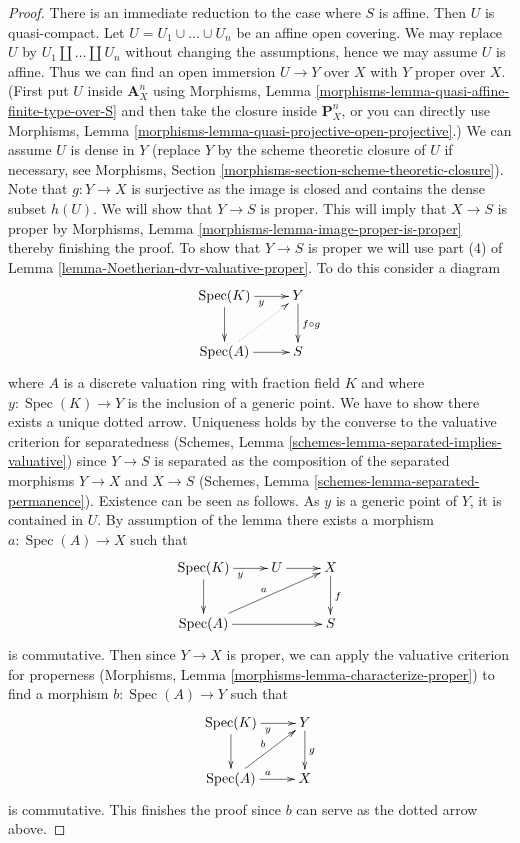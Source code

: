 \documentclass{stacks-project}
\theoremstyle{plain}
\theoremstyle{definition}
\theoremstyle{remark}
\numberwithin{equation}{subsection}
\def\Spec{\mathop{\mathrm{Spec}}}
\begin{document}
\begin{proof}
There is an immediate reduction to the case where $S$ is affine.
Then $U$ is quasi-compact.
Let $U = U_1 \cup \ldots \cup U_n$ be an affine open covering.
We may replace $U$ by $U_1 \amalg \ldots \amalg U_n$ without
changing the assumptions, hence we may assume $U$ is affine.
Thus we can find an open immersion $U \to Y$ over $X$
with $Y$ proper over $X$. (First put $U$ inside $\mathbf{A}^n_X$
using Morphisms, Lemma \ref{morphisms-lemma-quasi-affine-finite-type-over-S}
and then take the closure inside $\mathbf{P}^n_X$, or you can directly
use Morphisms, Lemma \ref{morphisms-lemma-quasi-projective-open-projective}.)
We can assume $U$ is dense in $Y$ (replace $Y$ by the scheme theoretic
closure of $U$ if necessary, see Morphisms, Section
\ref{morphisms-section-scheme-theoretic-closure}).
Note that $g : Y \to X$ is surjective as the image is closed
and contains the dense subset $h(U)$.
We will show that $Y \to S$ is proper. This will imply that
$X \to S$ is proper by
Morphisms, Lemma \ref{morphisms-lemma-image-proper-is-proper}
thereby finishing the proof.
To show that $Y \to S$ is proper we will use
part (4) of Lemma \ref{lemma-Noetherian-dvr-valuative-proper}.
To do this consider a diagram
$$
\xymatrix{
\Spec(K) \ar[r]_y \ar[d] & Y \ar[d]^{f \circ g} \\
\Spec(A) \ar[r] \ar@{..>}[ru] & S
}
$$
where $A$ is a discrete valuation ring with fraction field $K$
and where $y : \Spec(K) \to Y$ is the inclusion of a generic point.
We have to show there exists a unique dotted arrow.
Uniqueness holds by the converse to the valuative criterion
for separatedness
(Schemes, Lemma \ref{schemes-lemma-separated-implies-valuative})
since $Y \to S$ is separated as the
composition of the separated morphisms $Y \to X$ and $X \to S$
(Schemes, Lemma \ref{schemes-lemma-separated-permanence}).
Existence can be seen as follows.
As $y$ is a generic point of $Y$, it is contained in $U$.
By assumption of the lemma
there exists a morphism $a : \Spec(A) \to X$ such that
$$
\xymatrix{
\Spec(K) \ar[r]_y \ar[d] & U \ar[r] & X \ar[d]^f \\
\Spec(A) \ar[rr] \ar[rru]^a & & S
}
$$
is commutative. Then since $Y \to X$ is proper, we can
apply the valuative criterion for properness
(Morphisms, Lemma \ref{morphisms-lemma-characterize-proper})
to find a morphism $b : \Spec(A) \to Y$ such that
$$
\xymatrix{
\Spec(K) \ar[r]_y \ar[d] & Y \ar[d]^g \\
\Spec(A) \ar[r]^a \ar[ru]^b & X
}
$$
is commutative. This finishes the proof since
$b$ can serve as the dotted arrow above.
\end{proof}
\end{document}
